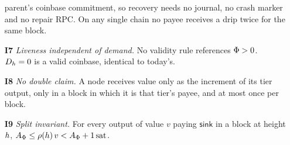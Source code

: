 \begin{property}
\begin{enumerate}
    parent's coinbase commitment, so recovery needs no journal, no crash marker and no repair RPC.
    On any single chain no payee receives a drip twice for the same block.
  \item[\textbf{I7}] \emph{Liveness independent of demand.} No validity rule references
    $\Phi > 0$. $D_{h} = 0$ is a valid coinbase, identical to today's.
  \item[\textbf{I8}] \emph{No double claim.} A node receives \PNR value only as the increment of its
    \PoN tier output, only in a block in which it is that tier's payee, and at most once per block.
  \item[\textbf{I9}] \emph{Split invariant.} For every output of value $v$ paying $\mathsf{sink}$ in
    a block at height $h$, $A_\Phi \le \rho(h)\,v < A_\Phi + 1\,\mathrm{sat}$.
\end{enumerate}
\end{property}

